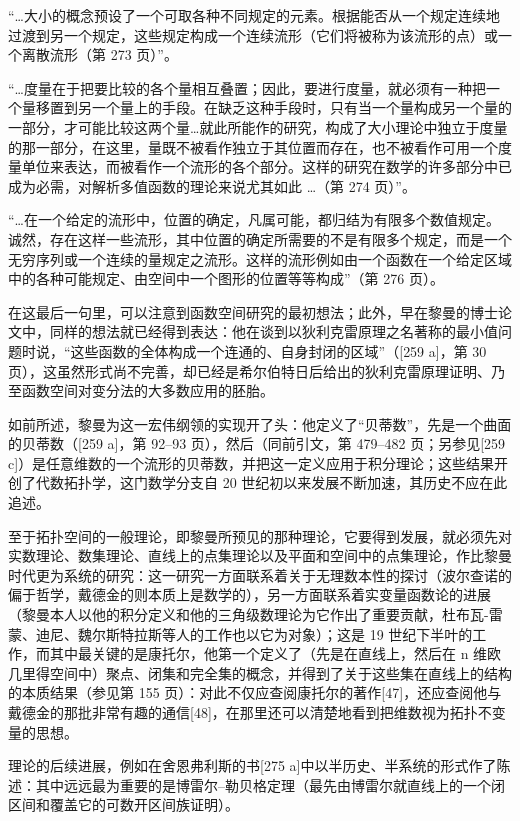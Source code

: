 “\ldots 大小的概念预设了一个可取各种不同规定的元素。根据能否从一个规定连续地过渡到另一个规定，这些规定构成一个连续流形（它们将被称为该流形的点）或一个离散流形（第 273 页）”。

“\ldots 度量在于把要比较的各个量相互叠置；因此，要进行度量，就必须有一种把一个量移置到另一个量上的手段。在缺乏这种手段时，只有当一个量构成另一个量的一部分，才可能比较这两个量\ldots{}就此所能作的研究，构成了大小理论中独立于度量的那一部分，在这里，量既不被看作独立于其位置而存在，也不被看作可用一个度量单位来表达，而被看作一个流形的各个部分。这样的研究在数学的许多部分中已成为必需，对解析多值函数的理论来说尤其如此 \ldots{}（第 274 页）”。

“\ldots 在一个给定的流形中，位置的确定，凡属可能，都归结为有限多个数值规定。诚然，存在这样一些流形，其中位置的确定所需要的不是有限多个规定，而是一个无穷序列或一个连续的量规定之流形。这样的流形例如由一个函数在一个给定区域中的各种可能规定、由空间中一个图形的位置等等构成”（第 276 页）。

在这最后一句里，可以注意到函数空间研究的最初想法；此外，早在黎曼的博士论文中，同样的想法就已经得到表达：他在谈到以狄利克雷原理之名著称的最小值问题时说，“这些函数的全体构成一个连通的、自身封闭的区域”（{[}259 a{]}，第 30 页），这虽然形式尚不完善，却已经是希尔伯特日后给出的狄利克雷原理证明、乃至函数空间对变分法的大多数应用的胚胎。

如前所述，黎曼为这一宏伟纲领的实现开了头：他定义了“贝蒂数”，先是一个曲面的贝蒂数（{[}259 a{]}，第 92–93 页），然后（同前引文，第 479–482 页；另参见{[}259 c{]}）是任意维数的一个流形的贝蒂数，并把这一定义应用于积分理论；这些结果开创了代数拓扑学，这门数学分支自 20 世纪初以来发展不断加速，其历史不应在此追述。

至于拓扑空间的一般理论，即黎曼所预见的那种理论，它要得到发展，就必须先对实数理论、数集理论、直线上的点集理论以及平面和空间中的点集理论，作比黎曼时代更为系统的研究：这一研究一方面联系着关于无理数本性的探讨（波尔查诺的偏于哲学，戴德金的则本质上是数学的），另一方面联系着实变量函数论的进展（黎曼本人以他的积分定义和他的三角级数理论为它作出了重要贡献，杜布瓦-雷蒙、迪尼、魏尔斯特拉斯等人的工作也以它为对象）；这是 19 世纪下半叶的工作，而其中最关键的是康托尔，他第一个定义了（先是在直线上，然后在 n 维欧几里得空间中）聚点、闭集和完全集的概念，并得到了关于这些集在直线上的结构的本质结果（参见第 155 页）：对此不仅应查阅康托尔的著作{[}47{]}，还应查阅他与戴德金的那批非常有趣的通信{[}48{]}，在那里还可以清楚地看到把维数视为拓扑不变量的思想。

理论的后续进展，例如在舍恩弗利斯的书{[}275 a{]}中以半历史、半系统的形式作了陈述：其中远远最为重要的是博雷尔–勒贝格定理（最先由博雷尔就直线上的一个闭区间和覆盖它的可数开区间族证明）。

